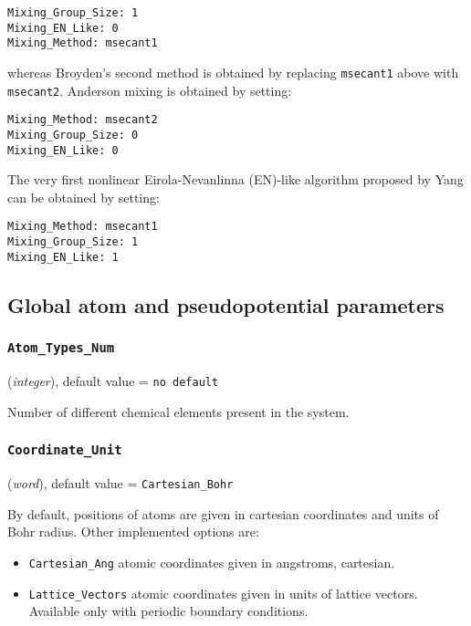 \documentclass{article}
\begin{document}
\begin{verbatim}
Mixing_Group_Size: 1
Mixing_EN_Like: 0
Mixing_Method: msecant1
\end{verbatim}
%
whereas Broyden's second method is obtained by replacing {\tt msecant1} above
with {\tt msecant2}. Anderson mixing is obtained by setting:

\begin{verbatim}
Mixing_Method: msecant2
Mixing_Group_Size: 0
Mixing_EN_Like: 0
\end{verbatim}

The very first nonlinear Eirola-Nevanlinna (EN)-like algorithm proposed by Yang
can be obtained by setting:

\begin{verbatim}
Mixing_Method: msecant1
Mixing_Group_Size: 1
Mixing_EN_Like: 1
\end{verbatim}








\subsection{Global atom and pseudopotential parameters}

\subsubsection{\tt Atom\_Types\_Num 
\label{AtomTypesNum}}
({\it integer}),
default value = {\tt no default }

Number of different chemical elements present in the system.

\subsubsection{\tt Coordinate\_Unit 
\label{CoordinateUnit}}
({\it word}),
default value = {\tt Cartesian\_Bohr }

By default, positions of atoms are given in cartesian coordinates and
units of Bohr radius. Other implemented options are:

\begin{itemize}
\item {\tt Cartesian\_Ang} atomic coordinates given in angstroms, cartesian.

\item {\tt Lattice\_Vectors} atomic coordinates given in units of lattice
  vectors. Available only with periodic boundary conditions.
\end{itemize}
\end{document}
